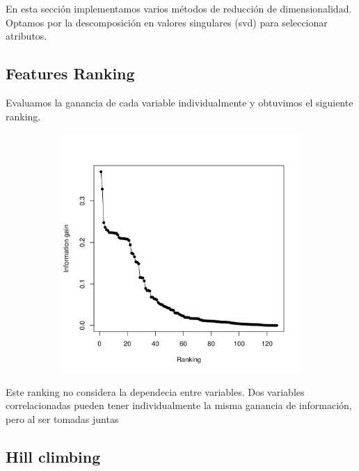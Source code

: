 \documentclass[a4paper,10pt]{article}
\begin{document}
En esta secci\'on implementamos varios m\'etodos de reducci\'on de dimensionalidad. Optamos por la descomposición en valores singulares (svd) para seleccionar atributos. 

\subsection{Features Ranking}

Evaluamos la ganancia de cada variable individualmente y obtuvimos el siguiente ranking. 

  \begin{figure}[H]
    \centering
    \begin{subfigure}[b]{0.4\textwidth}
      \includegraphics[width=\textwidth]{../imagenes/features_ranking}
     
    \end{subfigure}
      \caption{}
    \label{fig:features_ranking}
  \end{figure}

Este ranking no considera la dependecia entre variables. Dos variables correlacionadas pueden tener individualmente la misma ganancia de informaci\'on, pero al ser tomadas juntas

\subsection{Hill climbing}
\end{document}
